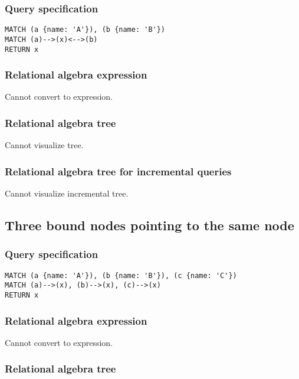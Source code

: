 \subsubsection*{Query specification}

\begin{lstlisting}
MATCH (a {name: 'A'}), (b {name: 'B'})
MATCH (a)-->(x)<-->(b)
RETURN x
\end{lstlisting}

\subsubsection*{Relational algebra expression}

Cannot convert to expression.

\subsubsection*{Relational algebra tree}

Cannot visualize tree.

\subsubsection*{Relational algebra tree for incremental queries}

Cannot visualize incremental tree.

\subsection{Three bound nodes pointing to the same node}

\subsubsection*{Query specification}

\begin{lstlisting}
MATCH (a {name: 'A'}), (b {name: 'B'}), (c {name: 'C'})
MATCH (a)-->(x), (b)-->(x), (c)-->(x)
RETURN x
\end{lstlisting}

\subsubsection*{Relational algebra expression}

Cannot convert to expression.

\subsubsection*{Relational algebra tree}

